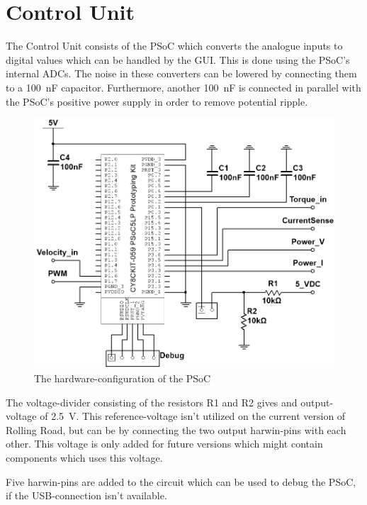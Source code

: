\newpage
\section{Control Unit}
The Control Unit consists of the PSoC which converts the analogue inputs to digital values which can be handled by the GUI. This is done using the PSoC's internal ADCs. The noise in these converters can be lowered by connecting them to a \SI{100}{\nano \farad} capacitor. Furthermore, another \SI{100}{\nano \farad} is connected in parallel with the PSoC's positive power supply in order to remove potential ripple.

\begin{figure}[H]
	\centering
	\includegraphics[width=0.8\linewidth]{Hardware/Pictures/PSoC}
	\caption{The hardware-configuration of the PSoC}
	\label{fig:PSoC_Hardware}
\end{figure}

The voltage-divider consisting of the resistors R1 and R2 gives and output-voltage of \SI{2.5}{\volt}. This reference-voltage isn't utilized on the current version of Rolling Road, but can be by connecting the two output harwin-pins with each other. This voltage is only added for future versions which might contain components which uses this voltage.

Five harwin-pins are added to the circuit which can be used to debug the PSoC, if the USB-connection isn't available. 